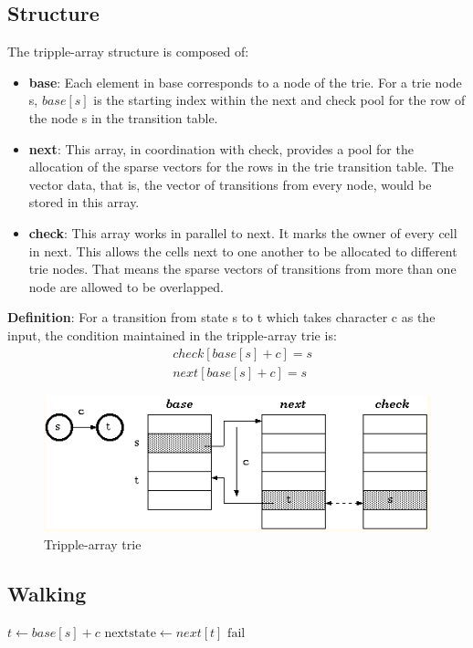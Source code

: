\documentclass[a3paper, 12pt]{book} %
\begin{document}
\subsection{Structure}
The tripple-array structure is composed of:
\begin{itemize}
	\item \textbf{base}: Each element in base corresponds to a node of the trie. For a trie node s, $base[s]$ is the starting index within the next and check pool for the row of the node s in the transition table. 
	\item \textbf{next}: This array, in coordination with check, provides a pool for the allocation of the sparse vectors for the rows in the trie transition table. The vector data, that is, the vector of transitions from every node, would be stored in this array. 
	\item \textbf{check}: This array works in parallel to next. It marks the owner of every cell in next. This allows the cells next to one another to be allocated to different trie nodes. That means the sparse vectors of transitions from more than one node are allowed to be overlapped.
\end{itemize}
\textbf{Definition}: For a transition from state s to t which takes character c as the input, the condition maintained in the tripple-array trie is:\\
\begin{equation}
\begin{split}
& check[base[s]+c]=s \\
& next[base[s]+c]=s
\end{split}
\end{equation}
\begin{figure}[htpb]
	\centering
	\includegraphics[width=12cm]{figures/tripple_array_trie.png}
	\caption{Tripple-array trie}
	\label{fig:boat1}
\end{figure}
\subsection{Walking}
\begin{algorithmic}
	\STATE $t\gets base[s] + c$
	\STATE $\mathrm{next state}\gets next[t]$
	\ELSE
	\STATE $\mathrm{fail}$
	\ENDIF 
\end{algorithmic}
\end{document}
